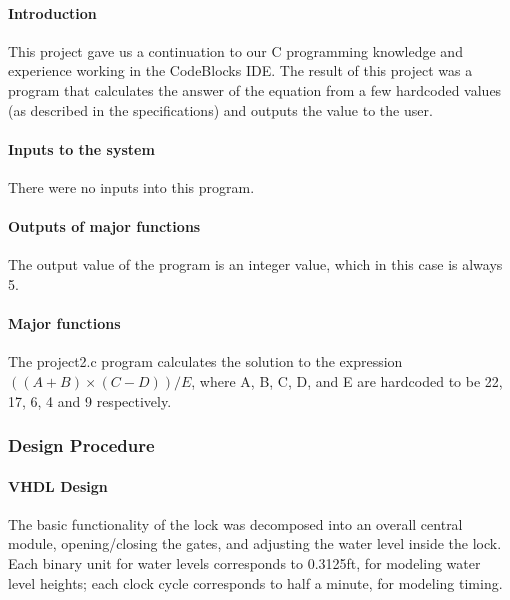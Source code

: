 \documentclass{article}
\begin{document}
      \paragraph{Introduction} This project gave us a continuation to our C programming knowledge and experience working in the CodeBlocks IDE. The result of this project was a program that calculates the answer of the equation from a few hardcoded values (as described in the specifications) and outputs the value to the user.

      \paragraph{Inputs to the system} There were no inputs into this program.
      \paragraph{Outputs of major functions} The output value of the program is an integer value, which in this case is always 5.

      \paragraph{Major functions} The project2.c program calculates the solution to the expression $((A + B) \times (C - D)) / E$, where A, B, C, D, and E are hardcoded to be 22, 17, 6, 4 and 9 respectively.

    \subsubsection{Design Procedure}
  		\paragraph{VHDL Design} The basic functionality of the lock was decomposed into an overall central module, opening/closing the gates, and adjusting the water level inside the lock. Each binary unit for water levels corresponds to 0.3125ft, for modeling water level heights; each clock cycle corresponds to half a minute, for modeling timing.
\end{document}
